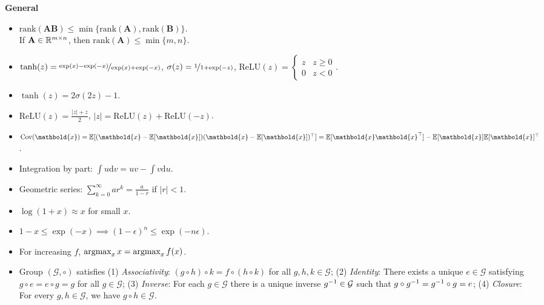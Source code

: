 \documentclass[10pt]{article}
\newenvironment{subtopic}[1]
{\begin{center}\textbf{\footnotesize \sffamily #1}\end{center}}
{}
\renewcommand{\mat}[1]{\ensuremath{\mathbf{#1}}}
\renewcommand{\vec}[1]{\ensuremath{\mathbold{#1}}}
\begin{document}
\begin{multicols*}{3}
\begin{subtopic}{General}
\begin{itemize}[left=0pt]
            \item $\mathrm{rank}(\mat{A}\mat{B}) \leq \min \{ \mathrm{rank}(\mat{A}), \mathrm{rank}(\mat{B}) \}$. \\
                If $\mat{A} \in \R^{m \times n}$, then $\mathrm{rank}(\mat{A}) \leq \min \{ m,n \}$.
            \item $\tanh(z) = \nicefrac{\exp(x) - \exp(-x)}{\exp(x) + \exp(-x)}$, $\sigma(z) = \nicefrac{1}{1+\exp(-z)}$, $\mathrm{ReLU}(z) = \begin{cases} z & z \geq 0 \\ 0 & z < 0 \end{cases}$.
            \item $\tanh(z) = 2 \sigma(2z) - 1$.
            \item $\mathrm{ReLU}(z) = \frac{|z| + z}{2}$, $|z| = \mathrm{ReLU}(z) + \mathrm{ReLU}(-z)$.
            \item $\mathrm{Cov}(\vec{x}) = \E[(\vec{x}-\E[\vec{x}])\transpose{(\vec{x} - \E[\vec{x}])}] = \E[\vec{x}\transpose{\vec{x}}] - \E[\vec{x}] \transpose{\E[\vec{x}]}$.
            \item Integration by part: $\int u\mathrm{d}v = uv - \int v\mathrm{d}u$.
            \item Geometric series: $\sum_{k=0}^{\infty} ar^k = \frac{a}{1-r}$ if $|r| < 1$.
            \item $\log(1+x) \approx x$ for small $x$.
            \item $1-x \leq \exp(-x) \implies (1-\epsilon)^n \leq \exp(-n \epsilon)$.
            \item For increasing $f$, $\operatorname*{argmax}_{x} x = \operatorname*{argmax}_{x} f(x)$.
            \item Group $(\mathcal{G}, \circ)$ satisfies (1) \textit{Associativity}: $(g \circ h) \circ k = f
                    \circ (h \circ k)$ for all $g,h,k \in \mathcal{G}$; (2) \textit{Identity}: There exists a
                unique $e \in \mathcal{G}$ satisfying $g \circ e = e \circ g = g$ for all $g \in
                    \mathcal{G}$; (3) \textit{Inverse}: For each $g \in \mathcal{G}$ there is a unique inverse
                $g^{-1} \in \mathcal{G}$ such that $g \circ g^{-1}  = g^{-1} \circ g = e$; (4) \textit{Closure}:
                For every $g, h \in \mathcal{G}$, we have $g \circ h \in \mathcal{G}$.
        \end{itemize}
    \end{subtopic}


\end{multicols*}
\end{document}
